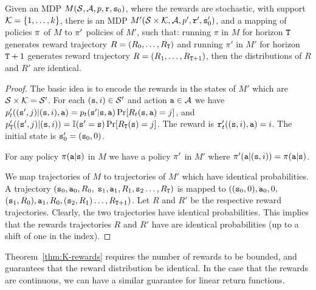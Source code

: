 \begin{theorem}
\label{thm:K-rewards}
%
 Given an MDP $M(\mathcal{S},\mathcal{A},p,{\tt r},{\tt s}_0)$,
where the rewards are stochastic, with support ${\cal
K}=\{1,\ldots,k\}$, there is an MDP $M'(\mathcal{S}\times {\cal
K},\mathcal{A},p',{\tt r}',{\tt s}_0')$, and a mapping of
policies $\pi$ of $M$ to $\pi'$ policies of $M'$, such that:
running $\pi$ in $M$ for horizon ${\tt T}$ generates reward
trajectory $R=(R_0, \ldots , R_{{\tt T}})$ and running $\pi'$ in
$M'$ for horizon ${\tt T}+1$ generates reward trajectory $R=(R_1,
\ldots , R_{{\tt T}+1})$, then the distributions of $R$ and $R'$
are identical.
\end{theorem}

\begin{proof}
The basic idea is to encode the rewards in the states of $M'$ which
are
$\mathcal{S}\times {\cal K}=\mathcal{S}'$.
%
For each $({\tt s},i)\in \mathcal{S}'$ and action ${\tt a}\in\mathcal{A}$ we
have
$p'_t(({\tt s}',j)|({\tt s},i),{\tt a})=p_t({\tt s}'|{\tt s},{\tt a})\Pr[R_t({\tt s},{\tt a})=j]$,
and
$p'_{{\tt T}}(({\tt s}',j)|({\tt s},i))=\mathbb{I}({\tt s}'={\tt s})\Pr[R_{{\tt T}}({\tt s})=j]$.
The reward is ${\tt r}'_t(({\tt s},i),{\tt a})=i$. The initial state
is ${\tt s}'_0=({\tt s}_0,0)$.

For any policy $\pi({\tt a}|{\tt s})$ in $M$ we have a policy
$\pi'$ in $M'$ where
$\pi'({\tt a}|({\tt s},i))=\pi({\tt a}|{\tt s})$.

We map trajectories of $M$ to trajectories of $M'$ which have
identical probabilities. A trajectory $({\tt s}_0, {\tt a}_0 , R_0 ,$
${\tt s}_1,{\tt a}_1,R_1, {\tt s}_2 \ldots, R_{{\tt T}})$ is mapped to
$(({\tt s}_0,0), {\tt a}_0 , 0 ,$ $ ({\tt s}_1,R_0),{\tt a}_1,R_0,
({\tt s}_2,R_1) \ldots, R_{{\tt T}+1})$. Let $R$ and $R'$ be the
respective reward trajectories.
%
Clearly, the two trajectories have identical probabilities. This
implies that the rewards trajectories $R$ and $R'$ have are
identical probabilities (up to a shift of one in the index).
\end{proof}

Theorem~\ref{thm:K-rewards} requires the number of rewards to be
bounded, and guarantees that the reward distribution be identical.
In the case that the rewards are continuous, we can have a similar
guarantee for linear return functions.



